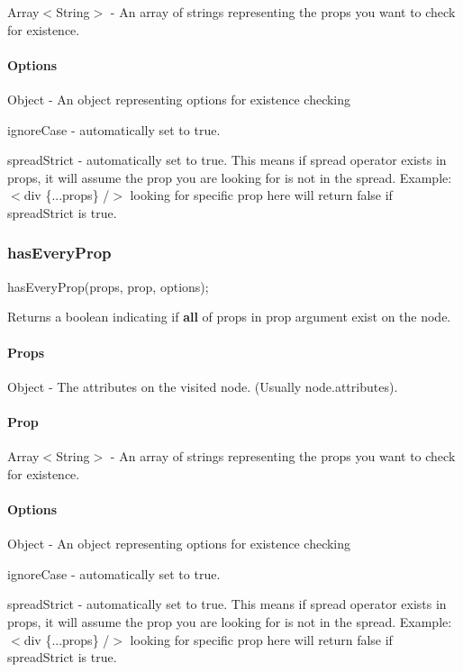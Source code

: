 Array$<$\+String$>$ -\/ An array of strings representing the props you want to check for existence. \paragraph*{Options}

Object -\/ An object representing options for existence checking
\begin{DoxyEnumerate}
\item {\ttfamily ignore\+Case} -\/ automatically set to {\ttfamily true}.
\item {\ttfamily spread\+Strict} -\/ automatically set to {\ttfamily true}. This means if spread operator exists in props, it will assume the prop you are looking for is not in the spread. Example\+: {\ttfamily $<$div \{...props\} /$>$} looking for specific prop here will return false if {\ttfamily spread\+Strict} is {\ttfamily true}.
\end{DoxyEnumerate}





\subsubsection*{has\+Every\+Prop}


\begin{DoxyCode}
hasEveryProp(props, prop, options);
\end{DoxyCode}
 Returns a boolean indicating if {\bfseries all} of props in {\ttfamily prop} argument exist on the node.

\paragraph*{Props}

Object -\/ The attributes on the visited node. (Usually {\ttfamily node.\+attributes}). \paragraph*{Prop}

Array$<$\+String$>$ -\/ An array of strings representing the props you want to check for existence. \paragraph*{Options}

Object -\/ An object representing options for existence checking
\begin{DoxyEnumerate}
\item {\ttfamily ignore\+Case} -\/ automatically set to {\ttfamily true}.
\item {\ttfamily spread\+Strict} -\/ automatically set to {\ttfamily true}. This means if spread operator exists in props, it will assume the prop you are looking for is not in the spread. Example\+: {\ttfamily $<$div \{...props\} /$>$} looking for specific prop here will return false if {\ttfamily spread\+Strict} is {\ttfamily true}.
\end{DoxyEnumerate}





